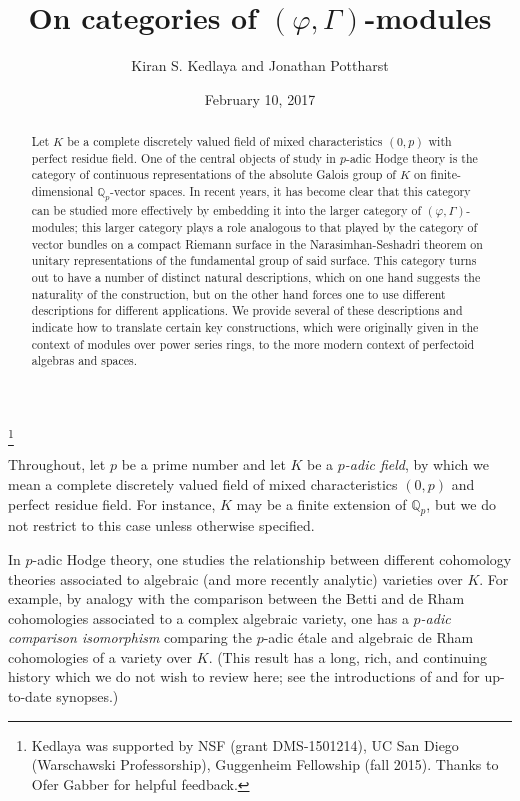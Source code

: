 \documentclass[12pt]{amsart}
\theoremstyle{definition}
\numberwithin{equation}{theorem}
\newcommand{\QQ}{\mathbb{Q}}
\begin{document}
\title{On categories of $(\varphi, \Gamma)$-modules}
\author{Kiran S. Kedlaya and Jonathan Pottharst}
\thanks{Kedlaya was supported by NSF (grant DMS-1501214), UC San Diego (Warschawski Professorship), Guggenheim Fellowship (fall 2015). Thanks to Ofer Gabber for helpful feedback.}
\date{February 10, 2017}

\begin{abstract}
Let $K$ be a complete discretely valued field of mixed characteristics $(0,p)$ with perfect residue field. One of the central objects of study in $p$-adic Hodge theory is the cate\-gory of continuous representations of the absolute Galois group of $K$ on finite-dimensional $\QQ_p$-vector spaces. In recent years, it has become clear that this category can be studied more effectively by embedding it into the larger category of $(\varphi, \Gamma)$-modules; this larger category plays a role analogous to that played by the category of vector bundles on a compact Riemann surface in the Narasimhan-Seshadri theorem on unitary representations of the fundamental group of said surface. This category turns out to have a number of distinct natural descriptions, which on one hand suggests the naturality of the construction, but on the other hand forces one to use different descriptions for different applications. We provide several of these descriptions and indicate how to translate certain key constructions, which were originally given in the context of modules over power series rings, to the more modern context of perfectoid algebras and spaces.
\end{abstract}

\maketitle

Throughout, let $p$ be a prime number and let $K$ be a \emph{$p$-adic field}, by which we mean a complete discretely valued field of mixed characteristics $(0,p)$ and perfect residue field. For instance, $K$ may be a finite extension of $\QQ_p$, but we do not restrict to this case unless otherwise specified.

In $p$-adic Hodge theory, one studies the relationship between different cohomology theories associated to algebraic (and more recently analytic) varieties over $K$. For example, by analogy with the comparison between the Betti and de Rham cohomologies associated to a complex algebraic variety, one has a \emph{$p$-adic comparison isomorphism} comparing the $p$-adic \'etale and algebraic de Rham cohomologies of a variety over $K$. (This result has a long, rich, and continuing history which we do not wish to review here; see the introductions of \cite{scholze2} and \cite{bhatt-morrow-scholze} for up-to-date synopses.) 
\end{document}
